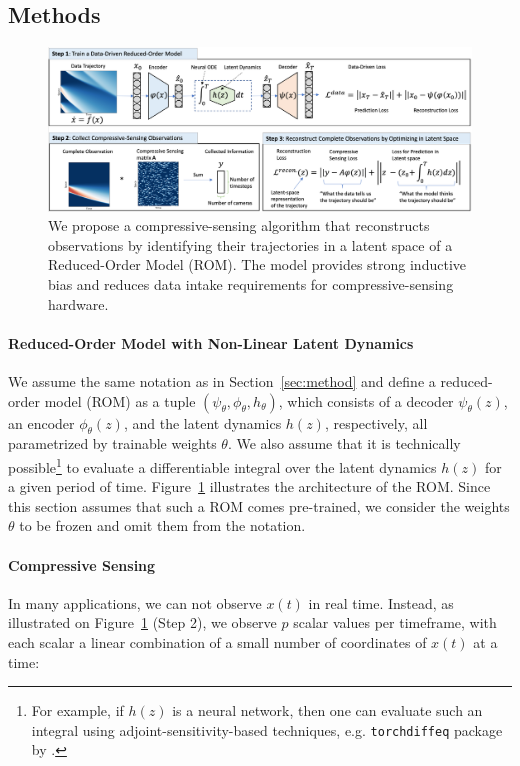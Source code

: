 \subsection{Methods}
\label{sec:cs_methods}
\begin{figure}
    \centering
    \includegraphics[width=\textwidth]{figures/cs_abstract.png}
    \caption{\label{fig:cs_abstract}We propose a compressive-sensing algorithm that reconstructs observations by identifying their trajectories in a latent space of a Reduced-Order Model (ROM). The model provides strong inductive bias and reduces data intake requirements for compressive-sensing hardware.}
\end{figure}

\paragraph{Reduced-Order Model with Non-Linear Latent Dynamics} We assume the same notation as in Section~\ref{sec:method} and define a reduced-order model (ROM) as a tuple $(\psi_\theta, \phi_\theta, h_\theta)$, which consists of a decoder $\psi_\theta(z)$, an encoder $\phi_\theta(z)$, and the latent dynamics $h(z)$, respectively, all parametrized by trainable weights $\theta$. We also assume that it is technically possible\footnote{For example, if $h(z)$ is a neural network, then one can evaluate such an integral using adjoint-sensitivity-based techniques, e.g. \texttt{torchdiffeq} package by \cite{chen2018neuralode}.} to evaluate a differentiable integral over the latent dynamics $h(z)$ for a given period of time. Figure~\ref{fig:cs_abstract} illustrates the architecture of the ROM. Since this section assumes that such a ROM comes pre-trained, we consider the weights $\theta$ to be frozen and omit them from the notation. 

\paragraph{Compressive Sensing} In many applications, we can not observe $x(t)$ in real time. Instead, as illustrated on Figure~\ref{fig:cs_abstract} (Step 2), we observe $p$ scalar values per timeframe, with each scalar a linear combination of a small number of coordinates of $x(t)$ at a time:

